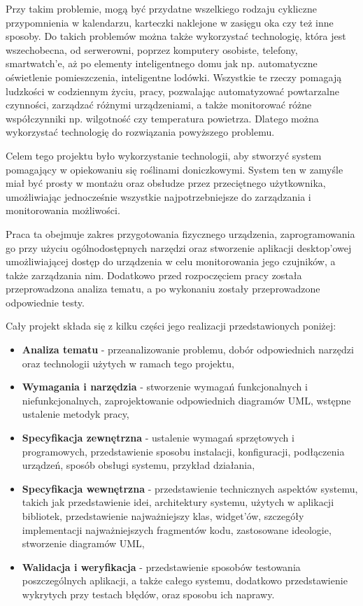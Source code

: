 \documentclass[a4paper,twoside,12pt]{book}
\begin{document}
Przy takim problemie, mogą być przydatne wszelkiego rodzaju cykliczne przypomnienia w kalendarzu, karteczki naklejone w zasięgu oka czy też inne sposoby. Do takich problemów można także wykorzystać technologię, która jest wszechobecna, od serwerowni, poprzez komputery osobiste, telefony, smartwatch'e, aż po elementy inteligentnego domu jak np. automatyczne oświetlenie pomieszczenia, inteligentne lodówki. Wszystkie te rzeczy pomagają ludzkości w codziennym życiu, pracy, pozwalając automatyzować powtarzalne czynności, zarządzać różnymi urządzeniami, a także monitorować różne współczynniki np. wilgotność czy temperatura powietrza. Dlatego można wykorzystać technologię do rozwiązania powyższego problemu.

Celem tego projektu było wykorzystanie technologii, aby stworzyć system pomagający w opiekowaniu się roślinami doniczkowymi. System ten w zamyśle miał być prosty w montażu oraz obsłudze przez przeciętnego użytkownika, umożliwiając jednocześnie wszystkie najpotrzebniejsze do zarządzania i monitorowania możliwości.

Praca ta obejmuje zakres przygotowania fizycznego urządzenia, zaprogramowania go przy użyciu ogólnodostępnych narzędzi oraz stworzenie aplikacji desktop'owej umożliwiającej dostęp do urządzenia w celu monitorowania jego czujników, a także zarządzania nim. Dodatkowo przed rozpoczęciem pracy została przeprowadzona analiza tematu, a po wykonaniu zostały przeprowadzone odpowiednie testy.

Cały projekt składa się z kilku części jego realizacji przedstawionych poniżej:
\begin{itemize}
   \item \textbf{Analiza tematu} - przeanalizowanie problemu, dobór odpowiednich narzędzi oraz technologii użytych w ramach tego projektu,
   \item \textbf{Wymagania i narzędzia} - stworzenie wymagań funkcjonalnych i niefunkcjonalnych, zaprojektowanie odpowiednich diagramów UML, wstępne ustalenie metodyk pracy,
   \item \textbf{Specyfikacja zewnętrzna} - ustalenie wymagań sprzętowych i programowych, przedstawienie sposobu instalacji, konfiguracji, podłączenia urządzeń, sposób obsługi systemu, przykład działania,
   \item \textbf{Specyfikacja wewnętrzna} - przedstawienie technicznych aspektów systemu, takich jak przedstawienie idei, architektury systemu, użytych w aplikacji bibliotek, przedstawienie najważniejszy klas, widget'ów, szczegóły implementacji najważniejszych fragmentów kodu, zastosowane ideologie, stworzenie diagramów UML,
   \item \textbf{Walidacja i weryfikacja} - przedstawienie sposobów testowania poszczególnych aplikacji, a także całego systemu, dodatkowo przedstawienie wykrytych przy testach błędów, oraz sposobu ich naprawy.
\end{itemize}
\end{document}
